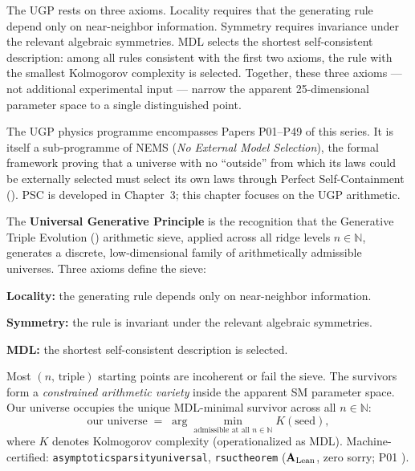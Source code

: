 \documentclass[11pt,openany]{book}
\theoremstyle{remark}
\newcommand{\UGP}{\text{UGP}}
\newcommand{\GTE}{\text{GTE}}
\newcommand{\PSC}{\text{PSC}}
\newcommand{\lean}[1]{%
  \penalty-100
  \begingroup\def\_{\textunderscore\allowbreak}\texttt{#1}\endgroup}
\newcommand{\CatAL}{\ensuremath{\textbf{A}_{\rm Lean}}}
\begin{document}
The UGP rests on three axioms.
Locality requires that the generating rule depend only on near-neighbor information.
Symmetry requires invariance under the relevant algebraic symmetries.
MDL selects the shortest self-consistent description: among all rules consistent with the
first two axioms, the rule with the smallest Kolmogorov complexity is selected.
Together, these three axioms --- not additional experimental input --- narrow the apparent
25-dimensional parameter space to a single distinguished point.

The UGP physics programme encompasses Papers P01--P49 of this series.
It is itself a sub-programme of NEMS (\emph{No External Model Selection}), the formal
framework proving that a universe with no ``outside'' from which its laws could be
externally selected must select its own laws through Perfect Self-Containment (\PSC).
PSC is developed in Chapter~3; this chapter focuses on the UGP arithmetic.

\begin{tcolorbox}[colback=green!5,colframe=green!50!black,
  title={Definition: Universal Generative Principle (\UGP)},breakable]
The \textbf{Universal Generative Principle} is the recognition that the Generative
Triple Evolution (\GTE) arithmetic sieve, applied across all ridge levels
$n \in \mathbb{N}$, generates a discrete, low-dimensional family of arithmetically
admissible universes.
Three axioms define the sieve:
\begin{description}[itemsep=2pt,topsep=3pt,leftmargin=1.6cm,labelwidth=1.4cm]
\item[A1.] \textbf{Locality:} the generating rule depends only on near-neighbor information.
\item[A2.] \textbf{Symmetry:} the rule is invariant under the relevant algebraic symmetries.
\item[A3.] \textbf{MDL:} the shortest self-consistent description is selected.
\end{description}
Most $(n,\,\text{triple})$ starting points are incoherent or fail the sieve.
The survivors form a \emph{constrained arithmetic variety} inside the apparent
SM parameter space.
Our universe occupies the unique MDL-minimal survivor across all $n \in \mathbb{N}$:
\[
  \text{our universe} \;=\;
  \arg\min_{\text{admissible at all }n \in \mathbb{N}} K(\text{seed}),
\]
where $K$ denotes Kolmogorov complexity (operationalized as MDL).
Machine-certified: \lean{asymptotic\_sparsity\_universal}, \lean{rsuc\_theorem} (\CatAL, zero sorry; P01 \cite{SpivackSM}).
\end{tcolorbox}
\end{document}
